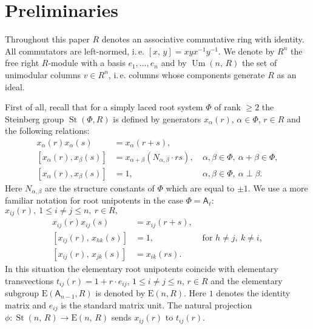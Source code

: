 \documentclass[11pt]{amsart}
\theoremstyle{plain} \declaretheorem[name=Theorem, Refname={Theorem,Theorems}]{tm} \Crefname{tm}{Theorem}{Theorems}
\numberwithin{equation}{section}
\theoremstyle{definition} \newtheorem{df}[lm]{Definition} \Crefname{df}{Definition}{Definitions}
\theoremstyle{remark} \newtheorem{rk}[lm]{Remark} \Crefname{rk}{Remark}{Remarks}
\newcommand{\E}{{\mathrm{E}}}
\newcommand{\Um}{\mathop{\mathrm{Um}}\nolimits}
\newcommand{\St}{\mathop{\mathrm{St}}\nolimits}
\newcommand{\inv}{^{-1}}
\newcommand{\rA}{\mathsf{A}}
\begin{document}
\section{Preliminaries} \label{sec:prelim}
Throughout this paper $R$ denotes an associative commutative ring with identity.
All commutators are left-normed, i.\,e. $[x,\,y]=xyx\inv y\inv$. 
We denote by $R^n$ the free right $R$-module with a basis $e_1,\ldots,e_n$ and by $\Um(n,\,R)$ the set of unimodular columns $v\in R^n$, i.\,e. 
columns whose components generate $R$ as an ideal.

First of all, recall that for a simply laced root system $\Phi$ of rank $\geq 2$ the Steinberg group $\St(\Phi, R)$ 
is defined by generators $x_\alpha(r)$, $\alpha\in\Phi$, $r\in R$ and the following relations:
\begin{align}
 x_\alpha(r) x_\alpha(s) & = x_\alpha(r+s), & \nonumber \\
 [x_\alpha(r),  x_\beta(s)] & = x_{\alpha+\beta}(N_{\alpha,\beta}\cdot rs), &\ \alpha,\beta\in \Phi,\ \alpha+\beta\in\Phi, \nonumber \\
 [x_\alpha(r),  x_\beta(s)] & = 1, &\ \alpha,\beta\in \Phi,\ \alpha \perp \beta. \nonumber
\end{align}
Here $N_{\alpha,\beta}$ are the structure constants of $\Phi$ which are equal to $\pm 1$.
We use a more familiar notation for root unipotents in the case $\Phi=\rA_\ell$:
$x_{ij}(r),\ 1\leq i\neq j\leq n,\ r\in R,$
\setcounter{equation}{0}
\renewcommand{\theequation}{S\arabic{equation}}
\begin{align}
x_{ij}(r)x_{ij}(s)      & = x_{ij}(r+s),& \label{add0}\\
[x_{ij}(r),\,x_{hk}(s)] & = 1,& \text{ for }h\neq j,\ k\neq i, \label{ccf1}\\
[x_{ij}(r),\,x_{jk}(s)] & = x_{ik}(rs).& \label{ccf2}
\end{align}
In this situation the elementary root unipotents coincide with elementary transvections $t_{ij}(r)=1+r \cdot e_{ij}$, $1\leq i\neq j\leq n$, $r\in R$
and the elementary subgroup $\E(\rA_{n-1}, R)$ is denoted by $\E(n, R)$.
Here $1$ denotes the identity matrix and $e_{ij}$ is the standard matrix unit. 
The natural projection $\phi\colon\St(n,\,R)\rightarrow\E(n,\,R)$ sends $x_{ij}(r)$ to $t_{ij}(r)$.
\end{document}
